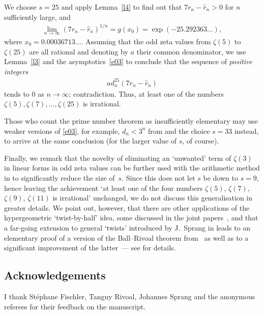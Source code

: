 \documentclass[pdftex]{sigma}
\begin{document}
We choose $s=25$ and apply Lemma~\ref{l4} to find out that $7r_n-\hat r_n>0 $ for $n$ sufficiently large, and
\begin{gather*}
\lim_{n\to\infty}(7r_n-\hat r_n)^{1/n}=g(x_0)=\exp(-25.292363\dots),
\end{gather*}
where $x_0=0.00036713\dots$. Assuming that the odd zeta values from $\zeta(5)$ to $\zeta(25)$ are all rational and denoting by $a$ their common denominator, we use Lemma~\ref{l3} and the asymptotics~\eqref{e03} to conclude that the sequence of \emph{positive integers}
\begin{gather*}
ad_n^{25}(7r_n-\hat r_n)
\end{gather*}
tends to $0$ as $n\to\infty$; contradiction. Thus, at least one of the numbers $\zeta(5),\zeta(7),\dots,\allowbreak\zeta(25)$ is irrational.

Those who count the prime number theorem as insufficiently elementary may use weaker versions of \eqref{e03}, for example, $d_n<3^n$ from \cite{Ha72} and the choice $s=33$ instead, to arrive at the same conclusion (for the larger value of $s$, of course).

Finally, we remark that the novelty of eliminating an `unwanted' term of $\zeta(3)$ in linear forms in odd zeta values can be further used with the arithmetic method in \cite{Zu04} to significantly reduce the size of~$s$. Since this does not let $s$ be down to $s=9$, hence leaving the achievement `at least one of the four numbers $\zeta(5)$, $\zeta(7)$, $\zeta(9)$, $\zeta(11)$ is irrational' unchanged, we do not discuss this generalisation in greater details. We point out, however, that there are other applications of the hypergeometric `twist-by-half' idea, some discussed in the joint papers~\cite{KZ18,RZ18}, and that a far-going extension to general `twists' introduced by J.~Sprang in \cite{Sp18} leads to an elementary proof of a version of the Ball--Rivoal theorem from~\cite{BR01} as well as to a significant improvement of the latter~--- see \cite{FSZ18} for details.

\subsection*{Acknowledgements}

I thank St\'ephane Fischler, Tanguy Rivoal, Johannes Sprang and the anonymous referees for their feedback on the manuscript.
\end{document}
